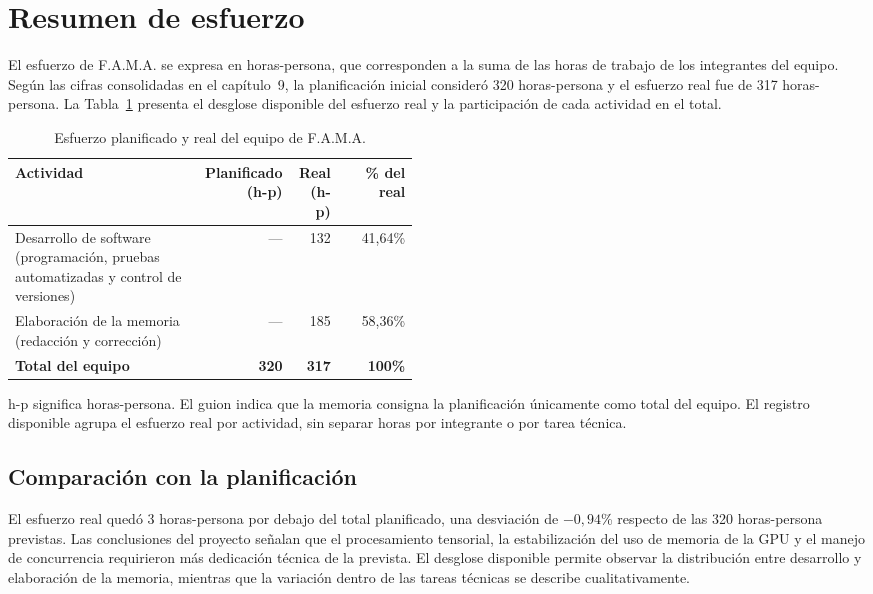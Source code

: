 \section{Resumen de esfuerzo}
\label{anexo:resumen-esfuerzo}

El esfuerzo de F.A.M.A. se expresa en horas-persona, que corresponden a
la suma de las horas de trabajo de los integrantes del equipo. Según las
cifras consolidadas en el capítulo~9, la planificación inicial consideró
320 horas-persona y el esfuerzo real fue de 317 horas-persona. La
Tabla~\ref{tab:esfuerzo-fama} presenta el desglose disponible del
esfuerzo real y la participación de cada actividad en el total.

\begin{table}[!htbp]
    \centering
    \caption{Esfuerzo planificado y real del equipo de F.A.M.A.}
    \label{tab:esfuerzo-fama}
    \small
    \setlength{\tabcolsep}{4pt}
    \renewcommand{\arraystretch}{1.15}
    \begin{tabular}{@{}p{0.47\linewidth}rrr@{}}
        \hline
        \textbf{Actividad} & \shortstack[r]{\textbf{Planificado}\\(h-p)} &
        \shortstack[r]{\textbf{Real}\\(h-p)} & \textbf{\% del real} \\
        \hline
        Desarrollo de software (programación, pruebas automatizadas y control de versiones)
        & --- & 132 & 41,64\% \\
        Elaboración de la memoria (redacción y corrección)
        & --- & 185 & 58,36\% \\
        \hline
        \textbf{Total del equipo} & \textbf{320} & \textbf{317} & \textbf{100\%} \\
        \hline
    \end{tabular}
    \par\smallskip
    \parbox{0.97\linewidth}{\footnotesize
    h-p significa horas-persona. El guion indica que la memoria
    consigna la planificación únicamente como total del equipo.
    El registro disponible agrupa el esfuerzo real por actividad,
    sin separar horas por integrante o por tarea técnica.}
\end{table}

\subsection{Comparación con la planificación}

El esfuerzo real quedó 3 horas-persona por debajo del total
planificado, una desviación de $-0{,}94$\% respecto de las 320
horas-persona previstas. Las conclusiones del proyecto señalan que el
procesamiento tensorial, la estabilización del uso de memoria de la
GPU y el manejo de concurrencia requirieron más dedicación técnica de
la prevista. El desglose disponible permite observar la distribución
entre desarrollo y elaboración de la memoria, mientras que la
variación dentro de las tareas técnicas se describe cualitativamente.

